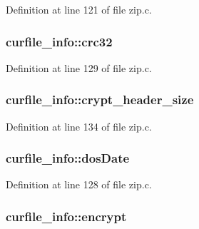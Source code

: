 Definition at line 121 of file zip.\-c.

\hypertarget{structcurfile__info_ab58f6860a40fdaf0932d659d8743f876}{
\subsubsection[{crc32}]{ curfile\-\_\-info\-::crc32}}\label{structcurfile__info_ab58f6860a40fdaf0932d659d8743f876}


Definition at line 129 of file zip.\-c.

\hypertarget{structcurfile__info_aec9ef70b3fa0459612a2c2b5c8c2c4ea}{
\subsubsection[{crypt\-\_\-header\-\_\-size}]{ curfile\-\_\-info\-::crypt\-\_\-header\-\_\-size}}\label{structcurfile__info_aec9ef70b3fa0459612a2c2b5c8c2c4ea}


Definition at line 134 of file zip.\-c.

\hypertarget{structcurfile__info_afb63cc461b5237c76e41904ed9fb726a}{
\subsubsection[{dos\-Date}]{ curfile\-\_\-info\-::dos\-Date}}\label{structcurfile__info_afb63cc461b5237c76e41904ed9fb726a}


Definition at line 128 of file zip.\-c.

\hypertarget{structcurfile__info_a5bc94d3a94e6ffe7f4e4783c668a263e}{
\subsubsection[{encrypt}]{ curfile\-\_\-info\-::encrypt}}\label{structcurfile__info_a5bc94d3a94e6ffe7f4e4783c668a263e}


